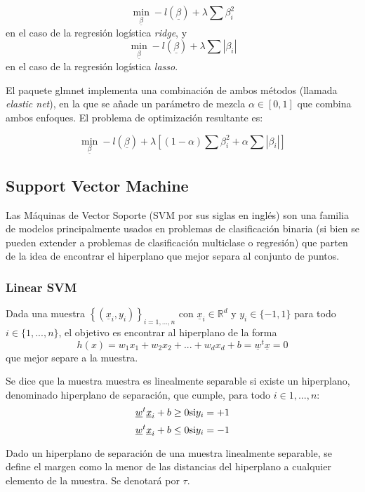 \documentclass[12pt,a4paper,]{book}
\numberwithin{dummy}{section}
\theoremstyle{ocrenumbox}
\theoremstyle{blacknumex}
\theoremstyle{blacknumbox}
\theoremstyle{ocrenum}
\theoremstyle{ocrenum}
\begin{document}
\[\min_{\underline \beta} -l(\underline \beta)  + \lambda \sum \beta_i^2 \]
en el caso de la regresión logística \emph{ridge}, y
\[\min_{\underline \beta} -l(\underline \beta)  + \lambda \sum |\beta_i|\]
en el caso de la regresión logística \emph{lasso}.

El paquete glmnet implementa una combinación de ambos métodos (llamada
\emph{elastic net}), en la que se añade un parámetro de mezcla
\(\alpha \in \left[0,1\right]\) que combina ambos enfoques. El problema
de optimización resultante es:

\[\min_{\underline \beta} -l(\underline \beta)  + \lambda \left[(1-\alpha)\sum \beta_i^2 + \alpha \sum |\beta_i| \right]\]

\hypertarget{support-vector-machine}{%
\subsection{Support Vector Machine}\label{support-vector-machine}}

Las Máquinas de Vector Soporte (SVM por sus siglas en inglés) son una
familia de modelos principalmente usados en problemas de clasificación
binaria (si bien se pueden extender a problemas de clasificación
multiclase o regresión) que parten de la idea de encontrar el hiperplano
que mejor separa al conjunto de puntos.

\hypertarget{linear-svm}{%
\subsubsection{Linear SVM}\label{linear-svm}}

Dada una muestra \(\left\{(\underline x_i,y_i) \right\}_{i=1,...,n}\)
con \(\underline x_i \in \mathbb{R}^d\) y \(y_i \in \{-1,1\}\) para todo
\(i \in \{1,...,n\}\), el objetivo es encontrar al hiperplano de la
forma
\[h(x) = w_1x_1 +w_2x_2+...+w_dx_d +b = \underline w^t \underline x = 0 \]
que mejor separe a la muestra.

Se dice que la muestra muestra es linealmente separable si existe un
hiperplano, denominado hiperplano de separación, que cumple, para todo
\(i \in 1,...,n\):
\[\underline w^t \underline x_i + b \ge 0 \space \space \text{si} \space \space y_i=+1\]
\[\underline w^t \underline x_i + b \le 0 \space \space \text{si} \space \space y_i=-1\]

Dado un hiperplano de separación de una muestra linealmente separable,
se define el margen como la menor de las distancias del hiperplano a
cualquier elemento de la muestra. Se denotará por \(\tau\).
\end{document}
